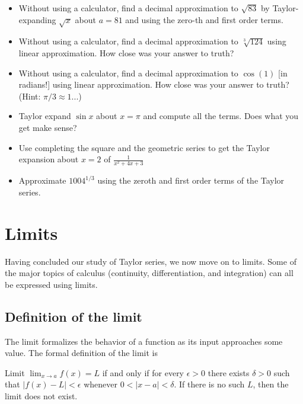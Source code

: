 \documentclass[twoside,openright,titlepage,a4paper]{book}
\begin{document}
\begin{sloppypar}
\begin{itemize}
\item Without using a calculator, find a decimal approximation to $\sqrt{83}$ by Taylor-expanding $\sqrt{x}$ about $a=81$ and using the zero-th and first order terms.
\item Without using a calculator, find a decimal approximation to $\sqrt[3]{124}$ using linear approximation. How close was your answer to truth?	
\item Without using a calculator, find a decimal approximation to $\cos(1)$ [in radians!] using linear approximation. How close was your answer to truth? (Hint: $\pi/3\approx 1$...)
\item Taylor expand $\sin x$ about $x=\pi$ and compute all the terms. Does what you get make sense?
\item Use completing the square and the geometric series to get the Taylor expansion about $x=2$ of $\frac{1}{x^2+4x+3}$
\item Approximate $1004^{1/3}$ using the zeroth and first order terms of the Taylor series.
\end{itemize}

\section{Limits} \label{ChFunctionsSecLimits}

Having concluded our study of Taylor series, we now move on to limits. Some of the major topics of calculus (continuity, differentiation, and integration) can all be expressed using limits.

\subsection{Definition of the limit}

The limit formalizes the behavior of a function as its input approaches some value. The formal definition of the limit is
\begin{definitionbox}
Limit $\displaystyle \lim_{x \rightarrow a} f(x) = L$ if and only if for every $\epsilon>0$ there exists $\delta>0$ such that $|f(x)-L|<\epsilon$ whenever $0<|x-a|<\delta$. If there is no such $L$, then the limit does not exist.
\end{definitionbox}


\end{sloppypar}
\end{document}
